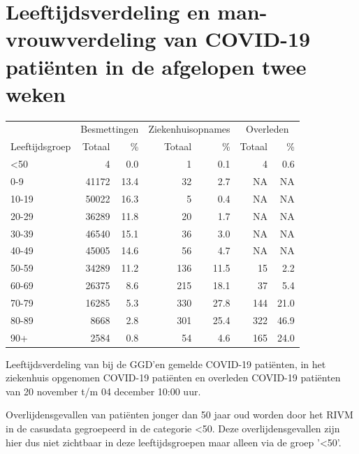 \documentclass[
  english,
  man,floatsintext]{apa6}
\begin{document}
\hypertarget{leeftijdsverdeling-en-man-vrouwverdeling-van-covid-19-patiuxebnten-in-de-afgelopen-twee-weken}{%
\section{Leeftijdsverdeling en man-vrouwverdeling van COVID-19 patiënten in de afgelopen twee weken}\label{leeftijdsverdeling-en-man-vrouwverdeling-van-covid-19-patiuxebnten-in-de-afgelopen-twee-weken}}

\begin{table}
\centering\begingroup\fontsize{11}{13}\selectfont

\begin{threeparttable}
\begin{tabular}{lrrrrrr}
\toprule
\multicolumn{1}{c}{ } & \multicolumn{2}{c}{Besmettingen} & \multicolumn{2}{c}{Ziekenhuisopnames} & \multicolumn{2}{c}{Overleden} \\
\cmidrule(l{3pt}r{3pt}){2-3} \cmidrule(l{3pt}r{3pt}){4-5} \cmidrule(l{3pt}r{3pt}){6-7}
Leeftijdsgroep & Totaal & \% & Totaal & \% & Totaal & \%\\
\midrule
<50 & 4 & 0.0 & 1 & 0.1 & 4 & 0.6\\
0-9 & 41172 & 13.4 & 32 & 2.7 & NA & NA\\
10-19 & 50022 & 16.3 & 5 & 0.4 & NA & NA\\
20-29 & 36289 & 11.8 & 20 & 1.7 & NA & NA\\
30-39 & 46540 & 15.1 & 36 & 3.0 & NA & NA\\
40-49 & 45005 & 14.6 & 56 & 4.7 & NA & NA\\
50-59 & 34289 & 11.2 & 136 & 11.5 & 15 & 2.2\\
60-69 & 26375 & 8.6 & 215 & 18.1 & 37 & 5.4\\
70-79 & 16285 & 5.3 & 330 & 27.8 & 144 & 21.0\\
80-89 & 8668 & 2.8 & 301 & 25.4 & 322 & 46.9\\
90+ & 2584 & 0.8 & 54 & 4.6 & 165 & 24.0\\
\bottomrule
\end{tabular}
\begin{tablenotes}
\item[1] Leeftijdsverdeling van bij de GGD’en gemelde COVID-19 patiënten, in het ziekenhuis opgenomen COVID-19 patiënten en overleden COVID-19 patiënten van 20 november t/m 04 december 10:00 uur.
\item[2] Overlijdensgevallen van patiënten jonger dan 50 jaar oud worden door het RIVM in de casusdata gegroepeerd in de categorie <50. Deze overlijdensgevallen zijn hier dus niet zichtbaar in deze leeftijdsgroepen maar alleen via de groep '<50'.
\end{tablenotes}
\end{threeparttable}
\endgroup{}
\end{table}
\end{document}
